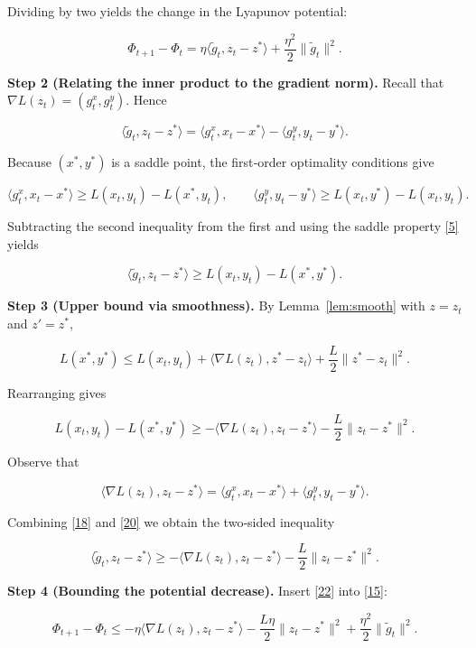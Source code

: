 Dividing by two yields the change in the Lyapunov potential:

\[
\Phi_{t+1}-\Phi_{t}
= \eta\langle\tilde g_{t},z_{t}-z^{*}\rangle
+\frac{\eta^{2}}{2}\|\tilde g_{t}\|^{2}.
\tag{15}
\]

\medskip
\noindent\textbf{Step 2 (Relating the inner product to the gradient norm).}  
Recall that \(\nabla L(z_{t})=(g^{x}_{t},g^{y}_{t})\). Hence  

\[
\langle\tilde g_{t},z_{t}-z^{*}\rangle
= \langle g^{x}_{t},x_{t}-x^{*}\rangle
-\langle g^{y}_{t},y_{t}-y^{*}\rangle.
\tag{16}
\]

Because \((x^{*},y^{*})\) is a saddle point, the first‑order optimality conditions give  

\[
\langle g^{x}_{t},x_{t}-x^{*}\rangle
\ge L(x_{t},y_{t})-L(x^{*},y_{t}),
\qquad
\langle g^{y}_{t},y_{t}-y^{*}\rangle
\ge L(x_{t},y^{*})-L(x_{t},y_{t}).
\tag{17}
\]

Subtracting the second inequality from the first and using the saddle property \eqref{5} yields  

\[
\langle\tilde g_{t},z_{t}-z^{*}\rangle
\ge L(x_{t},y_{t})-L(x^{*},y^{*}).
\tag{18}
\]

\medskip
\noindent\textbf{Step 3 (Upper bound via smoothness).}  
By Lemma~\ref{lem:smooth} with \(z=z_{t}\) and \(z'=z^{*}\),

\[
L(x^{*},y^{*})\le L(x_{t},y_{t})
+\langle\nabla L(z_{t}),z^{*}-z_{t}\rangle
+\frac{L}{2}\|z^{*}-z_{t}\|^{2}.
\tag{19}
\]

Rearranging gives  

\[
L(x_{t},y_{t})-L(x^{*},y^{*})
\ge -\langle\nabla L(z_{t}),z_{t}-z^{*}\rangle
-\frac{L}{2}\|z_{t}-z^{*}\|^{2}.
\tag{20}
\]

Observe that  

\[
\langle\nabla L(z_{t}),z_{t}-z^{*}\rangle
= \langle g^{x}_{t},x_{t}-x^{*}\rangle
+\langle g^{y}_{t},y_{t}-y^{*}\rangle.
\tag{21}
\]

Combining \eqref{18} and \eqref{20} we obtain the two‑sided inequality  

\[
\langle\tilde g_{t},z_{t}-z^{*}\rangle
\ge -\langle\nabla L(z_{t}),z_{t}-z^{*}\rangle
-\frac{L}{2}\|z_{t}-z^{*}\|^{2}.
\tag{22}
\]

\medskip
\noindent\textbf{Step 4 (Bounding the potential decrease).}  
Insert \eqref{22} into \eqref{15}:

\[
\Phi_{t+1}-\Phi_{t}
\le -\eta\langle\nabla L(z_{t}),z_{t}-z^{*}\rangle
-\frac{L\eta}{2}\|z_{t}-z^{*}\|^{2}
+\frac{\eta^{2}}{2}\|\tilde g_{t}\|^{2}.
\tag{23}
\]

